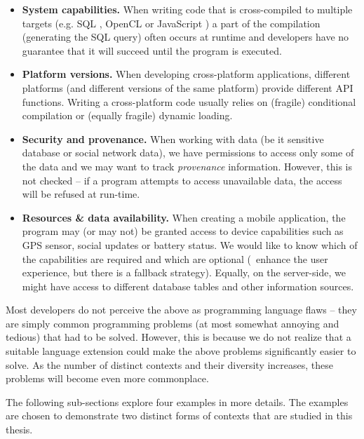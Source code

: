 \begin{itemize}
\item \textbf{System capabilities.} When writing code that is cross-compiled to multiple 
  targets (e.g. SQL \cite{app-linq}, OpenCL or JavaScript \cite{app-hop-lang}) a part of the compilation 
  (generating the SQL query) often occurs at runtime and developers have no guarantee that it will succeed 
  until the program is executed.  
  
\item \textbf{Platform versions.} When developing cross-platform applications, different platforms
  (and different versions of the same platform) provide different API functions. Writing a 
  cross-platform code usually relies on (fragile) conditional compilation or (equally fragile) 
  dynamic loading.
      
\item \textbf{Security and provenance.} When working with data (be it sensitive database or social 
   network data), we have permissions to access only some of the data and we may want to track 
   \emph{provenance} information. However, this is not checked -- if a program attempts to access 
   unavailable data, the access will be refused at run-time.
  
\item \textbf{Resources \& data availability.} When creating a mobile application, the program may
  (or may not) be granted access to device capabilities such as GPS sensor, social updates or battery
  status. We would like to know which of the capabilities are required and which are optional
  (\ie~enhance the user experience, but there is a fallback strategy). Equally, on the server-side,
  we might have access to different database tables and other information sources.
\end{itemize}

Most developers do not perceive the above as programming language flaws -- they are simply common
programming problems (at most somewhat annoying and tedious) that had to be solved. However, this 
is because we do not realize that a suitable language extension could make the above problems 
significantly easier to solve. As the number of distinct contexts and their diversity increases,
these problems will become even more commonplace.

The following sub-sections explore four examples in more details. The examples are chosen to 
demonstrate two distinct forms of contexts that are studied in this thesis.

